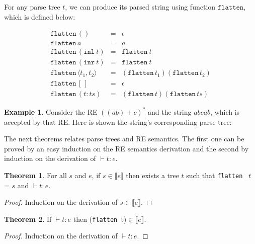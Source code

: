 \documentclass[review]{elsarticle}
\newcommand{\sembrackets}[1]{\ensuremath{\llbracket #1 \rrbracket}}
\newcommand{\flatten}{\ensuremath{\texttt{flatten}}}
\newcommand{\inl}{\ensuremath{\texttt{inl}}}
\newcommand{\inr}{\ensuremath{\texttt{inr}}}
\theoremstyle{definition}
\newtheorem{Theorem}{Theorem}
\newtheorem{Example}{Example}
\begin{document}
For any parse tree $t$, we can produce its parsed string using function 
\flatten, which is defined below:

\[
\begin{array}{lcl}
   \flatten\,() & = & \epsilon\\
   \flatten\,a  & = & a \\
   \flatten\,(\inl\:t) & = & \flatten\:t\\
   \flatten\,(\inr\:t) & = & \flatten\:t\\
   \flatten\,\langle t_1, t_2 \rangle & = & (\flatten\,t_1)(\flatten\,t_2)\\
   \flatten\,[\,] & = & \epsilon\\
   \flatten\,(t:ts) & = & (\flatten\,t)(\flatten\,ts)
\end{array}
\]                                                                                                                                


\begin{Example}
\label{example:parsetree}
Consider the RE $((ab)+c)^*$ and the string $abcab$, which is accepted by that RE. 
Here is shown the string's corresponding parse tree:

\begin{center}
\end{center}

\end{Example}

The next theorems relates parse trees and RE semantics.
The first one can be proved by an easy induction on the RE semantics derivation 
and the second by induction on the derivation of $\vdash t : e$.

\begin{Theorem}\label{theorem:semanticstypingflatten}
   For all $s$ and $e$, if $s \in \sembrackets{e}$ then exists a tree $t$
   such that \texttt{flatten } $t$ = $s$ and $\vdash t : e$.
\end{Theorem}
\begin{proof}
  Induction on the derivation of $s \in \sembrackets{e}$.
\end{proof}

\begin{Theorem}\label{theorem:typingflattensemantics}
If $\vdash t : e$ then (\texttt{flatten }t)$\in\sembrackets{e}$. 
\end{Theorem}
\begin{proof}
   Induction on the derivation of $\vdash t : e$.
\end{proof}
\end{document}
